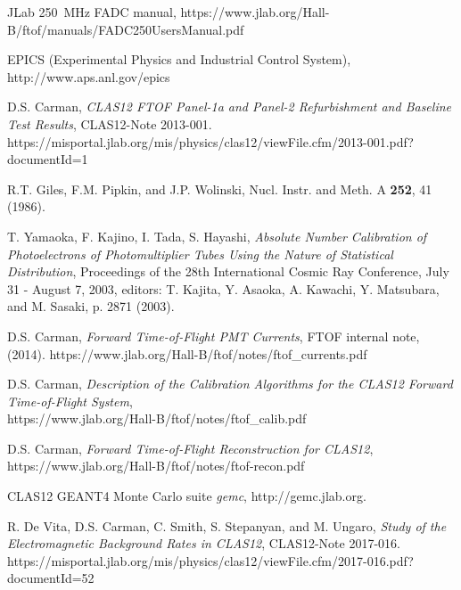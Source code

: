\documentclass{elsart}
\begin{document}
\begin{thebibliography}{99}
JLab 250~MHz FADC manual, https://www.jlab.org/Hall-B/ftof/manuals/FADC250UsersManual.pdf
  
EPICS (Experimental Physics and Industrial Control System),\\ http://www.aps.anl.gov/epics

D.S. Carman, {\it CLAS12 FTOF Panel-1a and Panel-2 Refurbishment and Baseline Test Results}, CLAS12-Note 2013-001.\\
https://misportal.jlab.org/mis/physics/clas12/viewFile.cfm/2013-001.pdf?documentId=1

R.T. Giles, F.M. Pipkin, and J.P. Wolinski, Nucl. Instr. and Meth. A {\bf 252}, 41 (1986).

T. Yamaoka, F. Kajino, I. Tada, S. Hayashi, {\it Absolute Number Calibration of Photoelectrons of
Photomultiplier Tubes Using the Nature of Statistical Distribution}, Proceedings of the 28th International
Cosmic Ray Conference, July 31 - August 7, 2003, editors: T. Kajita, Y. Asaoka, A. Kawachi, Y. Matsubara, and
M. Sasaki, p. 2871 (2003).

D.S. Carman, {\it Forward Time-of-Flight PMT Currents}, FTOF internal note, (2014).
https://www.jlab.org/Hall-B/ftof/notes/ftof\_currents.pdf

D.S. Carman, {\it Description of the Calibration Algorithms for the CLAS12 Forward Time-of-Flight System},\\
https://www.jlab.org/Hall-B/ftof/notes/ftof\_calib.pdf

D.S. Carman, {\it Forward Time-of-Flight Reconstruction for CLAS12},\\
https://www.jlab.org/Hall-B/ftof/notes/ftof-recon.pdf

CLAS12 GEANT4 Monte Carlo suite {\it gemc}, http://gemc.jlab.org.

R. De Vita, D.S. Carman, C. Smith, S. Stepanyan, and M. Ungaro, {\it Study of the Electromagnetic Background
Rates in CLAS12}, CLAS12-Note 2017-016.\\
https://misportal.jlab.org/mis/physics/clas12/viewFile.cfm/2017-016.pdf?documentId=52


\end{thebibliography}
\end{document}
